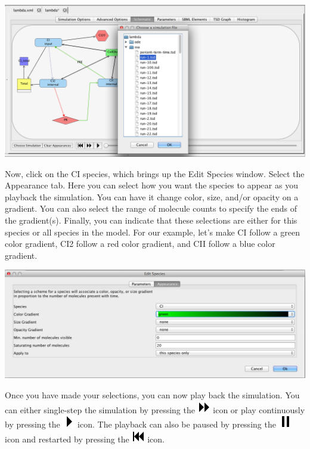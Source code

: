 \documentclass[titlepage,11pt]{article}
\begin{document}
\begin{center}
\includegraphics[width=160mm]{screenshots/chooseSim}
\end{center}

Now, click on the CI species, which brings up the Edit Species window.  Select the Appearance tab.  Here you can select how you want the species to appear as you playback the simulation.  You can have it change color, size, and/or opacity on a gradient.  You can also select the range of molecule counts to specify the ends of the gradient(s).  Finally, you can indicate that these selections are either for this species or all species in the model.  For our example, let's make CI follow a green color gradient, CI2 follow a red color gradient, and CII follow a blue color gradient.
\begin{center}
\includegraphics[width=160mm]{screenshots/editSpeciesAppearance}
\end{center}

Once you have made your selections, you can now play back the simulation.  You can either single-step the simulation by pressing the \includegraphics{../gui/icons/modelview/movie/single_step} icon or play continuously by pressing the \includegraphics{../gui/icons/modelview/movie/play} icon.  The playback can also be paused by pressing the \includegraphics{../gui/icons/modelview/movie/pause} icon and restarted by pressing the  \includegraphics{../gui/icons/modelview/movie/rewind} icon. 
\end{document}
